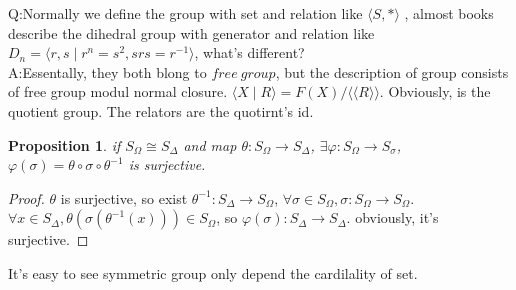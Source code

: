 \documentclass[10pt,a4paper]{article}
\newtheorem{proposition}[theorem]{Proposition}
\begin{document}
Q:Normally we define the group with set and relation like $\langle S,*\rangle$ , 
almost books describe the dihedral group with generator and relation like $D_n=\langle r,s\mid r^n=s^2,srs=r^{-1}\rangle$, 
what's different?\\
A:Essentally, they both blong to $free\:group$, but the description of group consists of free group modul normal closure.
$\langle X\mid R\rangle=F(X)/\langle\langle R\rangle\rangle$. Obviously, is the quotient group. The relators are the quotirnt's id.
\begin{proposition}
    if $S_{\Omega}\cong S_{\Delta}$ and map $\theta:S_{\Omega}\to S_{\Delta}$, $\exists\varphi:S_{\Omega}\to S_{\sigma}$, $\varphi(\sigma)=\theta\circ\sigma\circ\theta^{-1}$ is surjective.
\end{proposition}
\begin{proof}
    $\theta$ is surjective, so exist $\theta^{-1}:S_{\Delta}\to S_{\Omega}$, $\forall\sigma\in S_{\Omega},\sigma:S_{\Omega}\to S_{\Omega}$.
    $\forall x\in S_{\Delta},\theta(\sigma(\theta^{-1}(x)))\in S_{\Omega}$, so $\varphi(\sigma):S_{\Delta}\to S_{\Delta}$. obviously, it's surjective.
\end{proof}
It's easy to see symmetric group only depend the cardilality of set.\\
\end{document}
